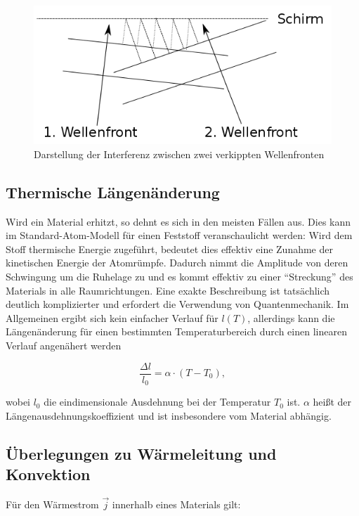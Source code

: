 \begin{figure}
\centering
        \includegraphics[width=.9\textwidth]{images/verkippung.png}
\caption{Darstellung der Interferenz zwischen zwei verkippten Wellenfronten}
\label{verkippung}
\end{figure}


\subsection{Thermische Längenänderung}
Wird ein Material erhitzt, so dehnt es sich in den meisten Fällen aus. Dies kann im Standard-Atom-Modell für einen Feststoff veranschaulicht werden: Wird dem Stoff thermische Energie zugeführt, bedeutet dies effektiv eine Zunahme der kinetischen Energie der Atomrümpfe. Dadurch nimmt die Amplitude von deren Schwingung um die Ruhelage zu und es kommt effektiv zu einer \enquote{Streckung} des Materials in alle Raumrichtungen. Eine exakte Beschreibung ist tatsächlich deutlich komplizierter und erfordert die Verwendung von Quantenmechanik. Im Allgemeinen ergibt sich kein einfacher Verlauf für $ l(T) $, allerdings kann die Längenänderung für einen bestimmten Temperaturbereich durch einen linearen Verlauf angenähert werden 

\begin{equation}
\frac{ \Delta l}{l_{0}} = \alpha \cdot (T-T_{0}), 
\label{formel:ausdehnung}
\end{equation}

wobei $ l_{0} $ die eindimensionale Ausdehnung bei der Temperatur $ T_{0} $ ist. $ \alpha $ heißt der Längenausdehnungskoeffizient und ist insbesondere vom Material abhängig. 

\subsection{Überlegungen zu Wärmeleitung und Konvektion}
Für den Wärmestrom $ \vec{j} $ innerhalb eines Materials gilt: 

